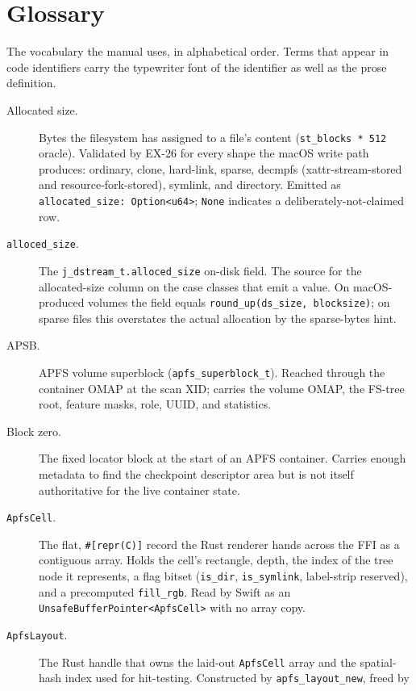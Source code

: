 \chapter*{Glossary}

The vocabulary the manual uses, in alphabetical order. Terms that
appear in code identifiers carry the typewriter font of the
identifier as well as the prose definition.

\begin{description}
  \item[Allocated size.] Bytes the filesystem has assigned to a
    file's content (\texttt{st\_blocks * 512} oracle). Validated
    by EX-26 for every shape the macOS write path produces:
    ordinary, clone, hard-link, sparse, decmpfs
    (xattr-stream-stored and resource-fork-stored), symlink, and
    directory. Emitted as
    \texttt{allocated\_size: Option<u64>}; \texttt{None} indicates
    a deliberately-not-claimed row.
  \item[\texttt{alloced\_size}.] The
    \texttt{j\_dstream\_t.alloced\_size} on-disk field. The source
    for the allocated-size column on the case classes that emit a
    value. On macOS-produced volumes the field equals
    \texttt{round\_up(ds\_size, blocksize)}; on sparse files this
    overstates the actual allocation by the sparse-bytes hint.
  \item[APSB.] APFS volume superblock
    (\texttt{apfs\_superblock\_t}). Reached through the container
    OMAP at the scan XID; carries the volume OMAP, the FS-tree
    root, feature masks, role, UUID, and statistics.
  \item[Block zero.] The fixed locator block at the start of an
    APFS container. Carries enough metadata to find the
    checkpoint descriptor area but is not itself authoritative for
    the live container state.
  \item[\texttt{ApfsCell}.] The flat, \texttt{\#[repr(C)]} record
    the Rust renderer hands across the FFI as a contiguous
    array. Holds the cell's rectangle, depth, the index of the
    tree node it represents, a flag bitset
    (\texttt{is\_dir}, \texttt{is\_symlink}, label-strip
    reserved), and a precomputed \texttt{fill\_rgb}. Read by
    Swift as an \texttt{UnsafeBufferPointer<ApfsCell>} with no
    array copy.
  \item[\texttt{ApfsLayout}.] The Rust handle that owns the
    laid-out \texttt{ApfsCell} array and the spatial-hash index
    used for hit-testing. Constructed by
    \texttt{apfs\_layout\_new}, freed by

\end{description}
